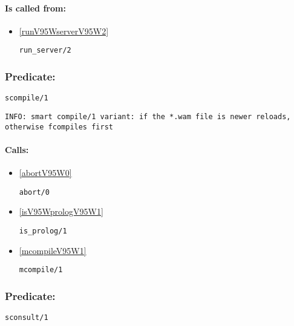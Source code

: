 \paragraph{Is called from:} 
\begin{itemize}
\item \ref{runV95WserverV95W2} 
\begin{verbatim}
run_server/2
\end{verbatim}

\end{itemize}

\subsubsection{Predicate:} \label{scompileV95W1}

\begin{verbatim}
scompile/1
\end{verbatim}

{\small \begin{verbatim}
INFO: smart compile/1 variant: if the *.wam file is newer reloads, otherwise fcompiles first

\end{verbatim}}
\paragraph{Calls:} 
\begin{itemize}
\item \ref{abortV95W0} 
\begin{verbatim}
abort/0
\end{verbatim}

\item \ref{isV95WprologV95W1} 
\begin{verbatim}
is_prolog/1
\end{verbatim}

\item \ref{mcompileV95W1} 
\begin{verbatim}
mcompile/1
\end{verbatim}

\end{itemize}

\subsubsection{Predicate:} \label{sconsultV95W1}

\begin{verbatim}
sconsult/1
\end{verbatim}

